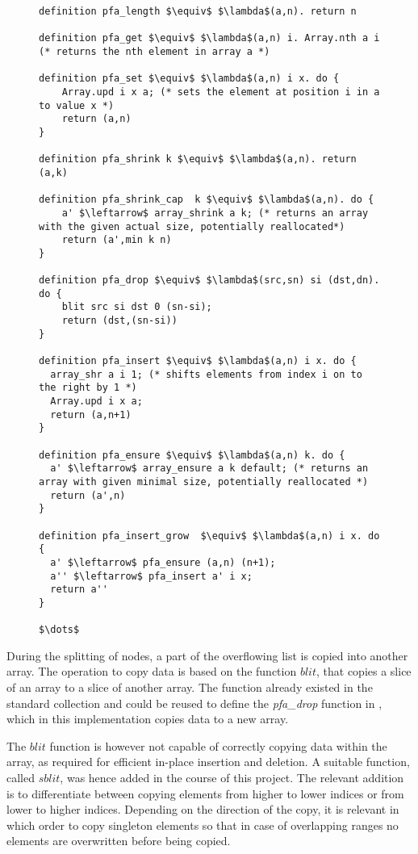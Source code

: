 \begin{figure}
\begin{lstlisting}[mathescape=true, language=Isabelle,label={lst:pfarray-def},
    caption={Important Partially Filled Array functions for Insertion.}]
definition pfa_length $\equiv$ $\lambda$(a,n). return n

definition pfa_get $\equiv$ $\lambda$(a,n) i. Array.nth a i (* returns the nth element in array a *)

definition pfa_set $\equiv$ $\lambda$(a,n) i x. do {
    Array.upd i x a; (* sets the element at position i in a to value x *)
    return (a,n)
}

definition pfa_shrink k $\equiv$ $\lambda$(a,n). return (a,k)

definition pfa_shrink_cap  k $\equiv$ $\lambda$(a,n). do {
    a' $\leftarrow$ array_shrink a k; (* returns an array with the given actual size, potentially reallocated*)
    return (a',min k n)
}

definition pfa_drop $\equiv$ $\lambda$(src,sn) si (dst,dn). do {
    blit src si dst 0 (sn-si);
    return (dst,(sn-si))
}

definition pfa_insert $\equiv$ $\lambda$(a,n) i x. do {
  array_shr a i 1; (* shifts elements from index i on to the right by 1 *)
  Array.upd i x a;
  return (a,n+1)
}

definition pfa_ensure $\equiv$ $\lambda$(a,n) k. do {
  a' $\leftarrow$ array_ensure a k default; (* returns an array with given minimal size, potentially reallocated *)
  return (a',n)
}

definition pfa_insert_grow  $\equiv$ $\lambda$(a,n) i x. do {
  a' $\leftarrow$ pfa_ensure (a,n) (n+1);
  a'' $\leftarrow$ pfa_insert a' i x;
  return a''
}

$\dots$
\end{lstlisting}
\end{figure}


During the splitting of nodes, a part of the overflowing
list is copied into another array.
The operation to copy data is based on the function $blit$,
that copies a slice of an array to a slice of another array.
The function already existed in the standard collection and could be reused
to define the \textit{pfa\_drop} function in , which in this implementation copies data to a new array.

The $blit$ function is however not capable of correctly copying data
within the array, as required for efficient in-place insertion and deletion.
A suitable function, called $sblit$, was hence added in the course of this project.
The relevant addition is to differentiate between copying elements
from higher to lower indices or from lower to higher indices.
Depending on the direction of the copy, it is relevant
in which order to copy singleton elements so that in case
of overlapping ranges no elements are overwritten before being copied.


